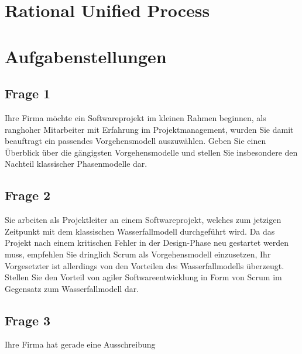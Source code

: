 \documentclass[a4paper, twopage]{scrreprt}
\begin{document}
\chapter{Rational Unified Process}


\chapter{Aufgabenstellungen}
\section{Frage 1}
Ihre Firma möchte ein Softwareprojekt im kleinen Rahmen beginnen, als ranghoher Mitarbeiter mit Erfahrung im Projektmanagement, wurden Sie damit beauftragt ein passendes Vorgehensmodell auszuwählen. Geben Sie einen Überblick über die gängigsten Vorgehensmodelle und stellen Sie insbesondere den Nachteil klassischer Phasenmodelle dar.
\section{Frage 2}
Sie arbeiten als Projektleiter an einem Softwareprojekt, welches zum jetzigen Zeitpunkt mit dem klassischen Wasserfallmodell durchgeführt wird. Da das Projekt nach einem kritischen Fehler in der Design-Phase neu gestartet werden muss, empfehlen Sie dringlich Scrum als Vorgehensmodell einzusetzen, Ihr Vorgesetzter ist allerdings von den Vorteilen des Wasserfallmodells überzeugt. Stellen Sie den Vorteil von agiler Softwareentwicklung in Form von Scrum im Gegensatz zum Wasserfallmodell dar.
\section{Frage 3}
Ihre Firma hat gerade eine Ausschreibung 

\nocite{*}
\printbibliography

\listoffigures
\end{document}
